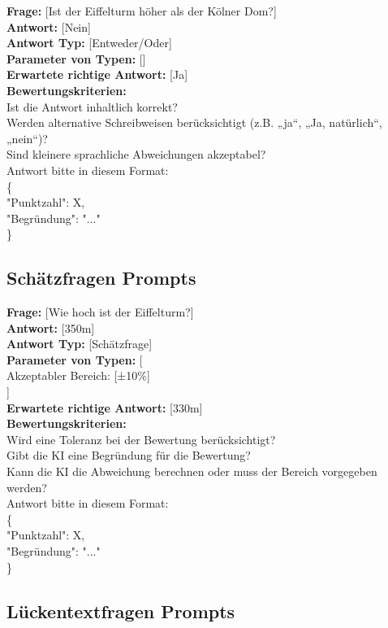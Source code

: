 \documentclass[a4paper,12pt]{article}
\begin{document}
\textbf{Frage:} [Ist der Eiffelturm höher als der Kölner Dom?] \\
\textbf{Antwort:} [Nein] \\
\textbf{Antwort Typ:} [Entweder/Oder] \\
\textbf{Parameter von Typen:} [] \\
\textbf{Erwartete richtige Antwort:} [Ja] \\
\textbf{Bewertungskriterien:} \\
Ist die Antwort inhaltlich korrekt? \\
Werden alternative Schreibweisen berücksichtigt (z.B. „ja“, „Ja, natürlich“, „nein“)? \\
Sind kleinere sprachliche Abweichungen akzeptabel? \\
Antwort bitte in diesem Format: \\
\{ \\
"Punktzahl": X, \\
"Begründung": "..." \\
\}

\subsection{Schätzfragen Prompts}

\textbf{Frage:} [Wie hoch ist der Eiffelturm?] \\
\textbf{Antwort:} [350m] \\
\textbf{Antwort Typ:} [Schätzfrage] \\
\textbf{Parameter von Typen:} [ \\
Akzeptabler Bereich: [±10\%] \\
] \\
\textbf{Erwartete richtige Antwort:} [330m] \\
\textbf{Bewertungskriterien:} \\
Wird eine Toleranz bei der Bewertung berücksichtigt? \\
Gibt die KI eine Begründung für die Bewertung? \\
Kann die KI die Abweichung berechnen oder muss der Bereich vorgegeben werden? \\
Antwort bitte in diesem Format: \\
\{ \\
"Punktzahl": X, \\
"Begründung": "..." \\
\}

\subsection{Lückentextfragen Prompts}
\end{document}
